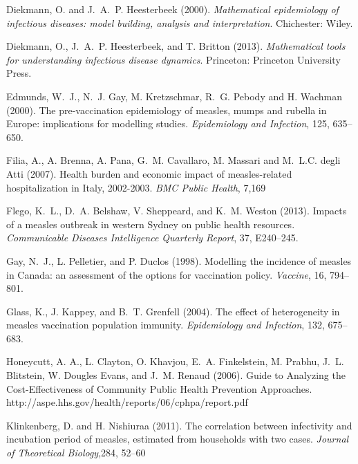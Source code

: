 \documentclass{article}
\begin{document}
\begin{itemize}
\begin{thebibliography}{}
Diekmann, O. and  J.~A.~P. Heesterbeek (2000).
\newblock \emph{Mathematical epidemiology of infectious diseases: model building, analysis and interpretation}.
Chichester: Wiley.

Diekmann, O.,  J.~A.~P. Heesterbeek, and T. Britton (2013).
\newblock \emph{Mathematical tools for understanding infectious disease dynamics}.
Princeton: Princeton University Press.

Edmunds, W.~J., N.~J. Gay, M. Kretzschmar, R.~G. Pebody and H. Wachman (2000).
\newblock The pre-vaccination epidemiology of measles, mumps and rubella in Europe: implications for modelling studies.
\newblock \emph{Epidemiology and Infection}, 125, 635--650.

Filia, A., A. Brenna, A. Pana, G.~M. Cavallaro, M. Massari and M.~L.C. degli Atti (2007).
\newblock Health burden and economic impact of measles-related hospitalization in Italy, 2002-2003.
\newblock \emph{BMC Public Health}, 7,169

Flego, K.~L., D.~A. Belshaw, V. Sheppeard, and K.~M. Weston (2013).
\newblock Impacts of a measles outbreak in western Sydney on public health resources.
\newblock \emph{Communicable Diseases Intelligence Quarterly Report}, 37, E240--245.

Gay, N.~J., L. Pelletier, and P. Duclos (1998).
\newblock Modelling the incidence of measles in Canada: an assessment of the options for vaccination policy.
\newblock \emph{Vaccine}, 16, 794--801.

Glass, K., J. Kappey, and B.~T. Grenfell (2004).
\newblock The effect of heterogeneity in measles vaccination population immunity.
\newblock \emph{Epidemiology and Infection}, 132, 675--683.

Honeycutt, A. A., L. Clayton, O. Khavjou, E.~A. Finkelstein, M. Prabhu, J.~L. Blitstein, W. Dougles Evans, and J.~M. Renaud (2006).
\newblock Guide to Analyzing the Cost-Effectiveness of Community Public Health Prevention Approaches.
http://aspe.hhs.gov/health/reports/06/cphpa/report.pdf

Klinkenberg, D. and H. Nishiuraa (2011).
\newblock The correlation between infectivity and incubation period of measles, estimated from households with two cases.
\newblock \emph{Journal of Theoretical Biology},284, 52--60


\end{thebibliography}
\end{itemize}
\end{document}

